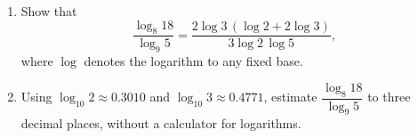 \begin{enumerate}
\item[(a)] Show that
\[\dfrac{\log_8 18}{\log_9 5}=\dfrac{2\log3\,(\log2+2\log3)}{3\log2\,\log5},\]
where $\log$ denotes the logarithm to any fixed base.
\item[(b)] Using $\log_{10}2\approx0.3010$ and $\log_{10}3\approx0.4771$, estimate $\dfrac{\log_8 18}{\log_9 5}$ to three decimal places, without a calculator for logarithms.
\end{enumerate}
